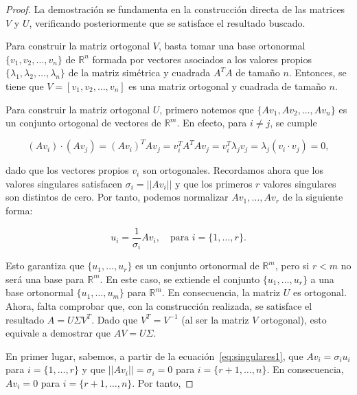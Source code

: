 \begin{proof}
    La demostración se fundamenta en la construcción directa de las matrices $V$ y $U$, verificando posteriormente que se satisface el resultado buscado.

    Para construir la matriz ortogonal $V$, basta tomar una base ortonormal $\{v_1, v_2, \ldots, v_n \}$ de $\mathbb{R}^{n}$ formada por vectores asociados a los valores propios $\{\lambda_1, \lambda_2, \ldots, \lambda_n\}$ de la matriz simétrica y cuadrada $A^{T}A$ de tamaño $n$. Entonces, se tiene que $V = [v_1, v_2, \ldots, v_n]$ es una matriz ortogonal y cuadrada de tamaño $n$.

    Para construir la matriz ortogonal $U$, primero notemos que $\{Av_1, Av_2, \ldots, Av_n \}$ es un conjunto ortogonal de vectores de $\mathbb{R}^{m}$. En efecto, para $i \neq j$, se cumple

    \[ (Av_i)\cdot(Av_j) = (Av_i)^{T}Av_j=v_{i}^{T}A^{T}Av_j = v_{i}^{T}\lambda_j v_j=\lambda_j(v_i \cdot v_j) = 0,\]

    dado que los vectores propios $v_i$ son ortogonales. Recordamos ahora que los valores singulares satisfacen $\sigma_i = ||Av_i||$ y que los primeros $r$ valores singulares son distintos de cero. Por tanto, podemos normalizar $Av_1, \ldots, Av_r$ de la siguiente forma:

    \begin{equation}
        u_i = \frac{1}{\sigma_i} A v_i, \quad \text{para } i = \{1, \ldots, r\}.
        \label{eq:singulares1}
    \end{equation}
    

    Esto garantiza que $\{ u_1, \ldots, u_r\}$ es un conjunto ortonormal de $\mathbb{R}^{m}$, pero si $r < m$ no será una base para $\mathbb{R}^{m}$. En este caso, se extiende el conjunto $\{u_1, \ldots, u_r \}$ a una base ortonormal $\{u_1, \ldots, u_m \}$ para $\mathbb{R}^{m}$. En consecuencia, la matriz $U$ es ortogonal. Ahora, falta comprobar que, con la construcción realizada, se satisface el resultado $A = U \Sigma V^{T}$. Dado que $V^{T} = V^{-1}$ (al ser la matriz $V$ ortogonal), esto equivale a demostrar que $AV = U\Sigma$.

    En primer lugar, sabemos, a partir de la ecuación~\eqref{eq:singulares1}, que $Av_i=\sigma_i u_i$ para $i=\{1, \ldots, r\}$ y que $||A v_i|| = \sigma_i = 0$ para $i=\{r+1, \ldots,n\}$. En consecuencia, $Av_i = 0$ para $i=\{r+1, \ldots,n\}$. Por tanto,


\end{proof}
